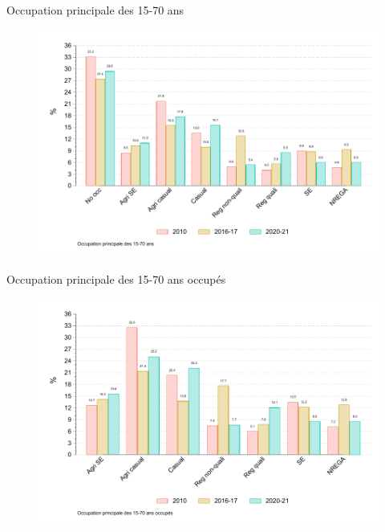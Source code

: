 \documentclass[aspectratio=169]{beamer}
\begin{document}
\begin{frame}[plain, shrink=2]{Occupation principale des 15-70 ans}
\begin{figure}[htpb]
\centering
\includegraphics[scale=0.9]{INPUT/evo_moc_1570.pdf}
\end{figure}
\end{frame}



\begin{frame}[plain, shrink=2]{Occupation principale des 15-70 ans occupés}
\begin{figure}[htpb]
\centering
\includegraphics[scale=0.9]{INPUT/evo_moc_1570act.pdf}
\end{figure}
\end{frame}
\end{document}

